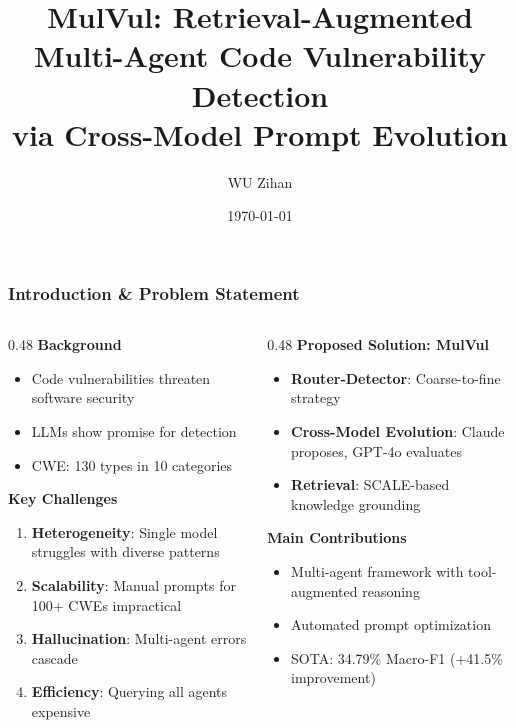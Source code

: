\documentclass[aspectratio=169,10pt]{beamer}
\title{\footnotesize MulVul: Retrieval-Augmented Multi-Agent Code Vulnerability Detection \\via Cross-Model Prompt Evolution}
\author{\scriptsize WU Zihan}
\date{\scriptsize \today}
\begin{document}
\frame{\titlepage}

\begin{frame}
\frametitle{\small Introduction \& Problem Statement}
\vspace{-0.15cm}
\begin{columns}[t]
\begin{column}{0.48\textwidth}
\textbf{\scriptsize Background}
\begin{itemize}\setlength{\itemsep}{0pt}
  \item[\scriptsize$\bullet$] {\scriptsize Code vulnerabilities threaten software security}
  \item[\scriptsize$\bullet$] {\scriptsize LLMs show promise for detection}
  \item[\scriptsize$\bullet$] {\scriptsize CWE: 130 types in 10 categories}
\end{itemize}

\vspace{0.1cm}
\textbf{\scriptsize Key Challenges}
\begin{enumerate}\setlength{\itemsep}{1pt}
  \item[\scriptsize 1.] {\scriptsize \textbf{Heterogeneity}: Single model struggles with diverse patterns}
  \item[\scriptsize 2.] {\scriptsize \textbf{Scalability}: Manual prompts for 100+ CWEs impractical}
  \item[\scriptsize 3.] {\scriptsize \textbf{Hallucination}: Multi-agent errors cascade}
  \item[\scriptsize 4.] {\scriptsize \textbf{Efficiency}: Querying all agents expensive}
\end{enumerate}
\end{column}

\begin{column}{0.48\textwidth}
\textbf{\scriptsize Proposed Solution: MulVul}
\begin{itemize}\setlength{\itemsep}{1pt}
  \item[\scriptsize$\star$] {\scriptsize \textbf{Router-Detector}: Coarse-to-fine strategy}
  \item[\scriptsize$\star$] {\scriptsize \textbf{Cross-Model Evolution}: Claude proposes, GPT-4o evaluates}
  \item[\scriptsize$\star$] {\scriptsize \textbf{Retrieval}: SCALE-based knowledge grounding}
\end{itemize}

\vspace{0.1cm}
\textbf{\scriptsize Main Contributions}
\begin{itemize}\setlength{\itemsep}{1pt}
  \item[\scriptsize$\diamond$] {\scriptsize Multi-agent framework with tool-augmented reasoning}
  \item[\scriptsize$\diamond$] {\scriptsize Automated prompt optimization}
  \item[\scriptsize$\diamond$] {\scriptsize SOTA: 34.79\% Macro-F1 (+41.5\% improvement)}
\end{itemize}
\end{column}
\end{columns}
\end{frame}
\end{document}
